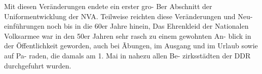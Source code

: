 Mit diesen Veränderungen endete ein erster gro-
Ber Abschnitt der Uniformentwicklung der NVA.
Teilweise reichten diese Veränderungen und Neu-
einführungen noch bis in die 60er Jahre hinein, Das
Ehrenkleid der Nationalen Volksarmee war in den
50er Jahren sehr rasch zu einem gewohnten An-
blick in der Öffentlichkeit geworden, auch bei
Ãbungen, im Ausgang und im Urlaub sowie auf Pa-
raden, die damals am 1. Mai in nahezu allen Be-
zirksstädten der DDR durchgefuhrt wurden.